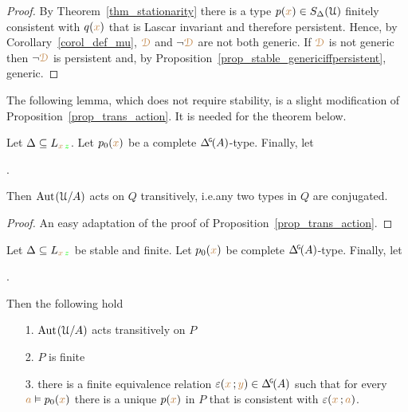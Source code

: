 \begin{proof}
  By Theorem~\ref{thm_stationarity} there is a type $p({\color{brown} x})\in S_\Delta(\EuScript U)$ finitely consistent with $q({\color{brown} x})$ that is Lascar invariant and therefore persistent.
  Hence, by Corollary~\ref{corol_def_mu}, ${\color{brown}\EuScript D}$ and $\neg{\color{brown}\EuScript D}$ are not both generic.
  If ${\color{brown}\EuScript D}$ is not generic then $\neg{\color{brown}\EuScript D}$ is persistent and, by Proposition~\ref{prop_stable_genericiffpersistent}, generic.
\end{proof}

The following lemma, which does not require stability, is a slight modification of Proposition~\ref{prop_trans_action}.
It is needed for the theorem below.

\begin{lemma}\label{lem_trans_action}
  Let $\Delta\subseteq L_{{\color{brown} x}\,{\color{green} z}}$.
  Let $p_0({\color{brown} x})$ be a complete $\GDelta(A)$-type.
  Finally, let 
  
  .
  
  Then ${\rm Aut\kern.15ex}(\EuScript U/A)$ acts on $Q$ transitively, i.e.\@ any two types in $Q$ are conjugated.
\end{lemma}

\begin{proof}
  An easy adaptation of the proof of Proposition~\ref{prop_trans_action}.
\end{proof}

\begin{theorem}\label{thm_FER}
  Let $\Delta\subseteq L_{{\color{brown} x}\,{\color{green} z}}$ be stable and finite.
  Let $p_0({\color{brown} x})$ be complete $\GDelta(A)$-type.
  Finally, let 
  
  .
  
  Then the following hold
  \begin{itemize}
    \item [1.] ${\rm Aut\kern.15ex}(\EuScript U/A)$ acts transitively on $P$
    \item [2.] $P$ is finite
    
    \item [3.] there is a finite equivalence relation $\epsilon({\mr x}\,;{\mr y})\in\GDelta(A)$ such that for every ${\color{brown} a}\vDash p_0({\color{brown} x})$ there is a unique $p({\color{brown} x})$ in $P$ that is consistent with $\varepsilon({\color{brown} x}\,;{\color{brown} a})$.
  \end{itemize}
\end{theorem}

